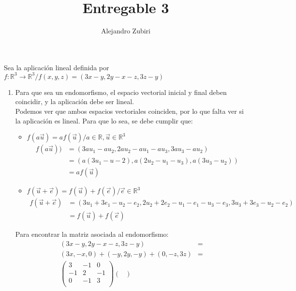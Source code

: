 \documentclass{article}
\title{Entregable 3}
\author{Alejandro Zubiri}
\begin{document}
\maketitle
Sea la aplicación lineal definida por \(f: \mathbb{R}^{3} \to \mathbb{R}^{3} / 
f(x,y,z) = (3x-y, 2y-x-z, 3z-y)\) 
\begin{enumerate}[label={(\alph*)}]
	\item Para que sea un endomorfismo, el espacio vectorial inicial y final deben coincidir,
		y la aplicación debe ser lineal.\\Podemos ver que ambos espacios vectoriales coinciden,
		por lo que falta ver si la aplicación es lineal. Para que lo sea, se debe cumplir que:
		\begin{itemize}
			\item \(f(a \vec{u})=af( \vec{u}) /a \in \mathbb{R}, \vec{u} \in \mathbb{R}^{3}\)\\
				\begin{equation}
					\begin{split}
						f(a \vec{u}))&=(3au_1-au_2,2au_2-au_1-au_3,3au_3-au_2)\\
									 &=(a(3u_1-u-2),a(2u_2-u_1-u_3),a(3u_3-u_2))\\
									 &=af(\vec{u})
					\end{split}
				\end{equation}
			\item \(f(\vec{u}+\vec{e})=f(\vec{u})+f(\vec{e}) / \vec{e} \in \mathbb{R}^{3}\)
				\begin{equation}
					\begin{split}
				f(\vec{u}+\vec{e})&=(3u_1+3e_1-u_2-e_2,2u_2+2e_2-u_1-e_1-u_3-e_3,3u_3+3e_3-u_2-e_2)\\
				&= f(\vec{u})+f(\vec{e})
					\end{split}
				\end{equation}
		\end{itemize}
	Para encontrar la matriz asociada al endomorfismo:
	\begin{equation}
		\begin{split}
			(3x-y,2y-x-z,3z-y)&=\\(3x,-x,0)+(-y,2y,-y)+(0,-z,3z)&=\\ \begin{pmatrix}
3 & -1 & 0 \\
-1 & 2 & -1 \\
0 & -1 & 3 \\
\end{pmatrix}\begin{pmatrix}

\end{pmatrix}
\end{split}
\end{equation}
\end{enumerate}
\end{document}
